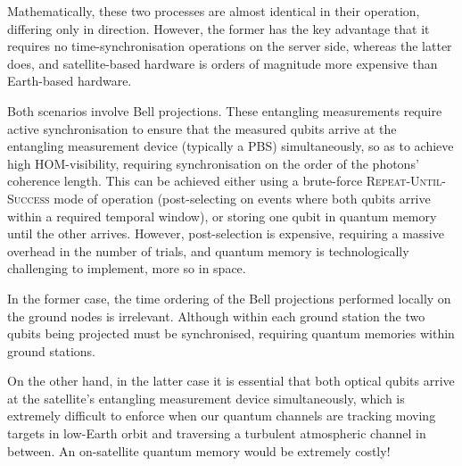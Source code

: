 Mathematically, these two processes are almost identical in their operation, differing only in direction. However, the former has the key advantage that it requires no time-synchronisation operations on the server side, whereas the latter does, and satellite-based hardware is orders of magnitude more expensive than Earth-based hardware.

Both scenarios involve Bell projections. These entangling measurements require active synchronisation to ensure that the measured qubits arrive at the entangling measurement device (typically a PBS) simultaneously, so as to achieve high HOM-visibility, requiring synchronisation on the order of the photons' coherence length. This can be achieved either using a brute-force \textsc{Repeat-Until-Success} mode of operation (post-selecting on events where both qubits arrive within a required temporal window), or storing one qubit in quantum memory until the other arrives. However, post-selection is expensive, requiring a massive overhead in the number of trials, and quantum memory is technologically challenging to implement, more so in space.

In the former case, the time ordering of the Bell projections performed locally on the ground nodes is irrelevant. Although within each ground station the two qubits being projected must be synchronised, requiring quantum memories within ground stations.

On the other hand, in the latter case it is essential that both optical qubits arrive at the satellite's entangling measurement device simultaneously, which is extremely difficult to enforce when our quantum channels are tracking moving targets in low-Earth orbit and traversing a turbulent atmospheric channel in between. An on-satellite quantum memory would be extremely costly!

